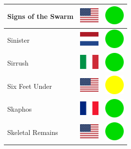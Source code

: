 \documentclass[12pt, a4paper, twoside]{report}
\begin{document}
\begin{center}
\begin{longtable}{|p{5cm}|p{2cm}|p{2cm}|}
 Signs of the Swarm                                         & \includegraphics[width=1cm]{../img/flags/us} &   \includegraphics[width=1cm]{../likes/y} \\ \hline
 Sinister                                                   & \includegraphics[width=1cm]{../img/flags/nl} &   \includegraphics[width=1cm]{../likes/y} \\ \hline
 Sirrush                                                    & \includegraphics[width=1cm]{../img/flags/it} &   \includegraphics[width=1cm]{../likes/y} \\ \hline
 Six Feet Under                                             & \includegraphics[width=1cm]{../img/flags/us} &   \includegraphics[width=1cm]{../likes/m} \\ \hline
 Skaphos                                                    & \includegraphics[width=1cm]{../img/flags/fr} &   \includegraphics[width=1cm]{../likes/y} \\ \hline
 Skeletal Remains                                           & \includegraphics[width=1cm]{../img/flags/us} &   \includegraphics[width=1cm]{../likes/y} \\ \hline

\end{longtable}
\end{center}
\end{document}
